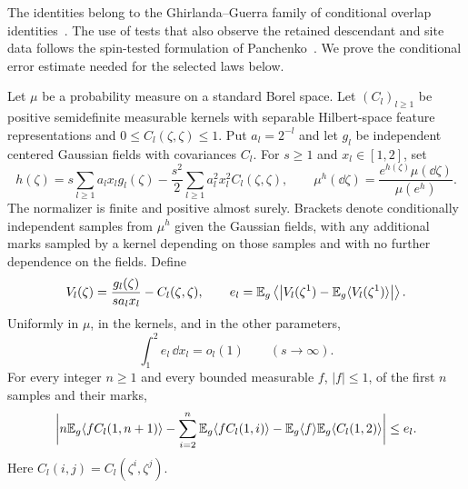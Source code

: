 The identities belong to the Ghirlanda--Guerra family of conditional
overlap identities~\cite[arXiv version, Equation~(28)]{GhirlandaGuerra1998}.
The use of tests that also observe the retained descendant and site data
follows the spin-tested
formulation of Panchenko~\cite[Equation~(14)]{Panchenko2015HE}.
We prove the conditional error estimate needed for the selected laws below.

\begin{lemma}\label{ct:gaussian}
Let $\mu$ be a probability measure on a standard Borel space.  Let
$(C_l)_{l\ge1}$ be positive semidefinite measurable kernels with separable
Hilbert-space feature representations and $0\le C_l(\zeta,\zeta)\le1$.
Put $a_l=2^{-l}$ and let $g_l$ be independent centered Gaussian fields with
covariances $C_l$.  For $s\ge1$ and $x_l\in[1,2]$, set
\begin{equation}\label{ct:gaussian-tilt}
 h(\zeta)=s\sum_{l\ge1}a_lx_lg_l(\zeta)
       -\frac{s^2}{2}\sum_{l\ge1}a_l^2x_l^2 C_l(\zeta,\zeta),
 \qquad
 \mu^h(\dd\zeta)=\frac{e^{h(\zeta)}\mu(\dd\zeta)}{\mu(e^h)}.
\end{equation}
The normalizer is finite and positive almost surely.
Brackets denote conditionally independent samples from $\mu^h$ given the
Gaussian fields, with any additional marks sampled by a kernel depending
on those samples and with no further dependence on the fields.  Define
\[
 V_l(\zeta)=\frac{g_l(\zeta)}{s a_lx_l}-C_l(\zeta,\zeta),
 \qquad
 e_l=\mathbb E_g\left\langle
  \left|V_l(\zeta^1)-\mathbb E_g\langle V_l(\zeta^1)\rangle\right|
 \right\rangle.
\]
Uniformly in $\mu$, in the kernels, and in the other parameters,
\begin{equation}\label{ct:error-integral}
                         \int_1^2 e_l\,\dd x_l=o_l(1)
                         \qquad(s\longrightarrow\infty).
\end{equation}
For every integer $n\ge1$ and every bounded measurable $f$, $|f|\le1$, of the first $n$ samples and
their marks,
\begin{align}\label{ct:approx-gg}
 \bigg|n\mathbb E_g\langle fC_l(1,n+1)\rangle
   -\sum_{i=2}^n\mathbb E_g\langle fC_l(1,i)\rangle
   -\mathbb E_g\langle f\rangle\mathbb E_g\langle C_l(1,2)\rangle\bigg|
 \le e_l.
\end{align}
Here $C_l(i,j)=C_l(\zeta^i,\zeta^j)$.
\end{lemma}

